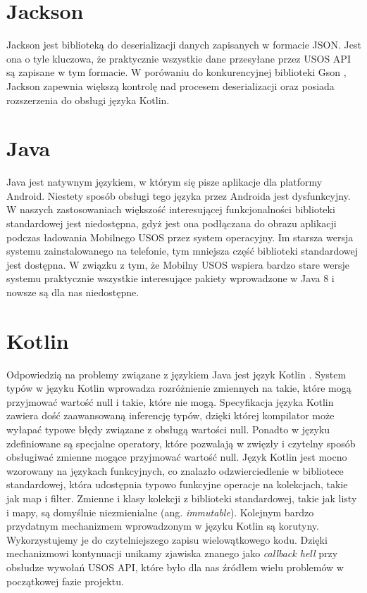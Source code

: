 \documentclass{pracamgr}
\begin{document}
\section{Jackson}

Jackson \cite{jackson} jest biblioteką do deserializacji danych zapisanych w
formacie JSON. Jest ona o tyle kluczowa, że praktycznie wszystkie dane przesyłane
przez USOS API są zapisane w tym formacie. W porówaniu do konkurencyjnej biblioteki
Gson \cite{gson}, Jackson zapewnia większą kontrolę nad procesem deserializacji
oraz posiada rozszerzenia do obsługi języka Kotlin.

\section{Java}

Java \cite{java} jest natywnym językiem, w którym się pisze aplikacje dla platformy
Android. Niestety sposób obsługi tego języka przez Androida jest dysfunkcyjny.
W naszych zastosowaniach większość interesującej funkcjonalności biblioteki
standardowej jest niedostępna, gdyż jest ona podłączana do obrazu aplikacji podczas
ładowania Mobilnego USOS przez system operacyjny. Im starsza wersja systemu
zainstalowanego na telefonie, tym mniejsza część biblioteki standardowej jest
dostępna. W związku z tym, że Mobilny USOS wspiera bardzo stare wersje systemu
praktycznie wszystkie interesujące pakiety wprowadzone w Java 8 i nowsze są dla
nas niedostępne.

\section{Kotlin}

Odpowiedzią na problemy związane z językiem Java jest język Kotlin \cite{kotlin}.
System typów w języku Kotlin wprowadza rozróżnienie zmiennych na takie, które mogą
przyjmować wartość null i takie, które nie mogą. Specyfikacja języka Kotlin zawiera
dość zaawansowaną inferencję typów, dzięki której kompilator może wyłapać typowe błędy
związane z obsługą wartości null. Ponadto w języku zdefiniowane są specjalne
operatory, które pozwalają w zwięzły i czytelny sposób obsługiwać zmienne mogące
przyjmować wartość null. Język Kotlin jest mocno wzorowany na językach funkcyjnych,
co znalazło odzwierciedlenie w bibliotece standardowej, która udostępnia typowo
funkcyjne operacje na kolekcjach, takie jak map i filter. Zmienne i klasy
kolekcji z biblioteki standardowej, takie jak listy i mapy, są domyślnie niezmienialne
(ang. \textit{immutable}). Kolejnym bardzo przydatnym mechanizmem wprowadzonym w
języku Kotlin są korutyny. Wykorzystujemy je do czytelniejszego zapisu wielowątkowego
kodu. Dzięki mechanizmowi kontynuacji unikamy zjawiska znanego jako \textit{callback hell}
przy obsłudze wywołań USOS API, które było dla nas źródłem wielu problemów w
początkowej fazie projektu.
\end{document}
